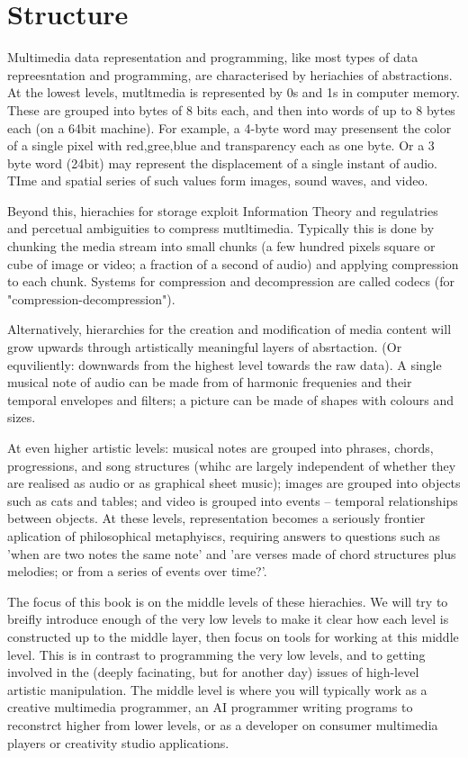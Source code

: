 \documentclass[oneside,english]{scrbook}
\begin{document}
\section{Structure}
Multimedia data representation and programming, like most types of data repreesntation and programming, are characterised by heriachies of abstractions. At the lowest levels, mutltmedia is represented by 0s and 1s in computer memory.  These are grouped into bytes of 8 bits each, and then into words of up to 8 bytes each (on a 64bit machine).  For example, a 4-byte word may presensent the color of a single pixel with red,gree,blue and transparency each as one byte.  Or a 3 byte word (24bit) may represent the displacement of a single instant of audio.  TIme and spatial series of such values form images, sound waves, and video.

Beyond this, hierachies for storage exploit Information Theory and regulatries and percetual ambiguities to compress mutltimedia.  Typically this is done by chunking the media stream into small chunks (a few hundred pixels square or cube of image or video; a fraction of a second of audio) and applying compression to each chunk.   Systems for compression and decompression are called codecs (for "compression-decompression"). 

Alternatively, hierarchies for the creation and modification of media content will grow upwards through artistically meaningful layers of absrtaction. (Or equviliently: downwards from the highest level towards the raw data).   A single musical note of audio can be made from of harmonic frequenies and their temporal envelopes and filters; a picture can be made of shapes with colours and sizes.  

At even higher artistic levels: musical notes are grouped into phrases, chords, progressions, and song structures (whihc are largely independent of whether they are realised as audio or as graphical sheet music); images are grouped into objects such as cats and tables; and video is grouped into events -- temporal relationships between objects.  At these levels, representation becomes a seriously frontier aplication of philosophical metaphyiscs, requiring answers to questions such as 'when are two notes the same note' and 'are verses made of chord structures plus melodies; or from a series of events over time?'. 

The focus of this book is on the middle levels of these hierachies. We will try to breifly introduce enough of the very low levels to make it clear how each level is constructed up to the middle layer, then focus on tools for working at this middle level.   This is in contrast to programming the very low levels, and to getting involved in the (deeply facinating, but for another day) issues of high-level artistic manipulation.   The middle level is where you will typically work as a creative multimedia programmer, an AI programmer writing programs to reconstrct higher from lower levels, or as a developer on consumer multimedia players or creativity studio applications.
\end{document}
